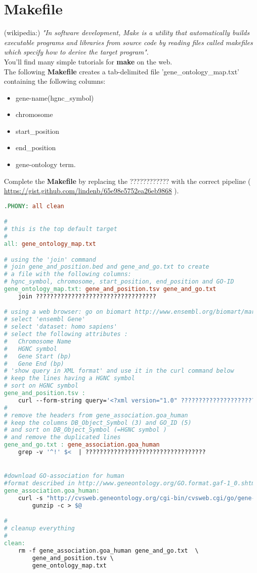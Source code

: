 \documentclass{article}
\begin{document}
\section{Makefile}
\noindent
(wikipedia:) \emph{"In software development, Make is a utility that automatically builds executable programs and libraries from source code by reading files called makefiles which specify how to derive the target program"}.\\You'll find many simple tutorials for \textbf{make} on the web.\\
The following \textbf{Makefile} creates a tab-delimited file 'gene\_ontology\_map.txt' containing the following columns:
\begin{itemize}
\item gene-name(hgnc\_symbol)
\item chromosome
\item start\_position
\item end\_position
\item gene-ontology term.
\end{itemize}
Complete the \textbf{Makefile} by replacing the ???????????? with the correct pipeline ( \url{https://gist.github.com/lindenb/65e98e5752ea26eb9868} ).

\begin{lstlisting}[language=make]
.PHONY: all clean

#
# this is the top default target
#
all: gene_ontology_map.txt

# using the 'join' command
# join gene_and_position.bed and gene_and_go.txt to create 
# a file with the following columns:  
# hgnc_symbol, chromosome, start_position, end_position and GO-ID
gene_ontology_map.txt: gene_and_position.tsv gene_and_go.txt
	join ??????????????????????????????????

# using a web browser: go on biomart http://www.ensembl.org/biomart/martview/
# select 'ensembl Gene'
# select 'dataset: homo sapiens'
# select the following attributes : 
#	Chromosome Name
#	HGNC symbol 
#	Gene Start (bp)
#	Gene End (bp)
# 'show query in XML format' and use it in the curl command below
# keep the lines having a HGNC symbol
# sort on HGNC symbol 
gene_and_position.tsv : 
	curl --form-string query='<?xml version="1.0" ??????????????????????????????????
#
# remove the headers from gene_association.goa_human
# keep the columns DB_Object_Symbol (3) and GO_ID (5)
# and sort on DB_Object_Symbol (=HGNC symbol )
# and remove the duplicated lines
gene_and_go.txt : gene_association.goa_human
	grep -v '^!' $<  | ??????????????????????????????????


#download GO-association for human
#format described in http://www.geneontology.org/GO.format.gaf-1_0.shtml
gene_association.goa_human:
	curl -s "http://cvsweb.geneontology.org/cgi-bin/cvsweb.cgi/go/gene-associations/$@.gz?rev=HEAD" |\
		gunzip -c > $@

#
# cleanup everything
#
clean:
	rm -f gene_association.goa_human gene_and_go.txt  \
		gene_and_position.tsv \
		gene_ontology_map.txt
\end{lstlisting}
\end{document}
